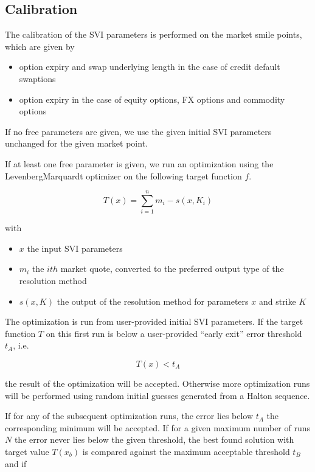 \documentclass{amsart}
\theoremstyle{plain}
\numberwithin{equation}{section}
\begin{document}
\subsection{Calibration}

The calibration of the SVI parameters is performed on the market smile points, which are given by

\begin{itemize}
\item option expiry and swap underlying length in the case of credit default swaptions
\item option expiry in the case of equity options, FX options and commodity options 
\end{itemize}

If no free parameters are given, we use the given initial SVI parameters unchanged for the given market point.

If at least one free parameter is given, we run an optimization using the LevenbergMarquardt optimizer on the following
target function $f$.

\begin{equation}
T(x) = \sum_{i=1}^n m_i - s(x, K_i)
\end{equation}

with

\begin{itemize}
\item $x$ the input SVI parameters
\item $m_i$ the $ith$ market quote, converted to the preferred output type of the resolution method
\item $s(x,K)$ the output of the resolution method for parameters $x$ and strike $K$
\end{itemize}

The optimization is run from user-provided initial SVI parameters. If the target function $T$ on this first run is
below a user-provided ``early exit'' error threshold $t_A$, i.e.

$$
T(x) < t_A
$$

the result of the optimization will be accepted. Otherwise more optimization runs will be performed using random initial
guesses generated from a Halton sequence.

If for any of the subsequent optimization runs, the error lies below $t_A$ the corresponding minimum will be
accepted. If for a given maximum number of runs $N$ the error never lies below the given threshold, the best found
solution with target value $T(x_b)$ is compared against the maximum acceptable threshold $t_B$ and if
\end{document}
